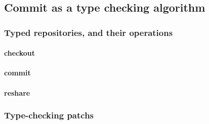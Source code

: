 \documentclass[9pt,authoryear]{sigplanconf}
\begin{document}





\subsection{Commit as a type checking algorithm}



\subsubsection{Typed repositories, and their operations}

\paragraph{checkout}

\paragraph{commit}


\paragraph{reshare}

\subsubsection{Type-checking patchs}
\end{document}
